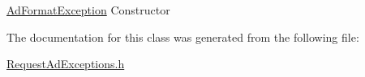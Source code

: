 \hyperlink{classglite_1_1wms_1_1jdl_1_1AdFormatException}{Ad\-Format\-Exception} Constructor 

The documentation for this class was generated from the following file:\begin{CompactItemize}
\item 
\hyperlink{RequestAdExceptions_8h}{Request\-Ad\-Exceptions.h}\end{CompactItemize}

